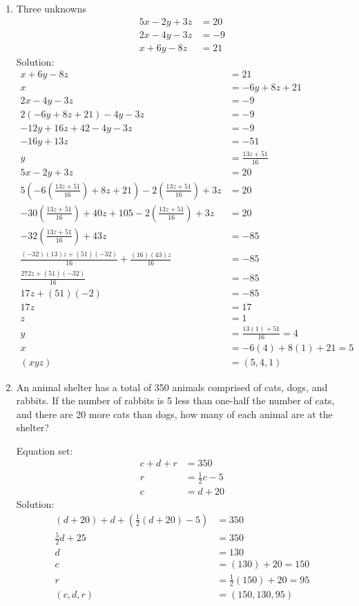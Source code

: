 \documentclass[12pt]{article}
\begin{document}
\begin{enumerate}
    \item Three unknowns 
    \begin{align*}
        5x - 2y + 3z &= 20
        \\ 2x - 4y - 3z &= -9
        \\ x + 6y -8z &= 21
    \end{align*}
    Solution: 
    \begin{align*}
        x + 6y -8z &= 21
        \\ x &= -6y + 8z +21
        \\ 2x - 4y - 3z &= -9
        \\ 2(-6y + 8z +21) - 4y - 3z &= -9
        \\ -12y + 16z + 42 -4y -3z &= -9
        \\ -16y + 13z &= -51
        \\ y &= \frac{13z +51}{16}
        \\ 5x - 2y + 3z &= 20
        \\ 5\left( -6\left(\frac{13z +51}{16}\right) + 8z +21 \right)-2\left(\frac{13z +51}{16}\right)+ 3z &= 20
        \\  -30\left(\frac{13z +51}{16}\right) +40z +105-2\left(\frac{13z +51}{16}\right)+ 3z &= 20
        \\ -32\left(\frac{13z +51}{16}\right) +43z &= -85
        \\ \frac{(-32)(13)z + (51)(-32)}{16} + \frac{(16)(43)z}{16} &= -85
        \\ \frac{272z + (51)(-32)}{16} &= -85
        \\ 17z + (51)(-2) &= -85
        \\ 17z &= 17
        \\ z&= 1
        \\ y &= \frac{13(1) + 51}{16} = 4
        \\ x&= -6(4) + 8(1) +21 = 5
        \\ (xyz) &= (5,4,1)
    \end{align*}

\item An animal shelter has a total of 350 animals comprised of cats, dogs, and rabbits. If the number of
rabbits is 5 less than one-half the number of cats, and there are 20 more cats than dogs, how many of
each animal are at the shelter?

Equation set: 
\begin{align*}
    c+d+r &= 350
    \\ r &= \frac{1}{2}c-5
    \\ c &= d+20
\end{align*}
Solution:
\begin{align*}
    (d+20) + d +\left( \frac{1}{2}(d+20) -5 \right) &= 350
    \\ \frac{5}{2}d +25 &= 350
    \\ d &= 130
    \\ c &= (130) + 20 = 150
    \\ r &= \frac{1}{2}(150) +20 = 95
    \\ (c,d,r) &= (150,130,95)
\end{align*}
\end{enumerate}
\end{document}
